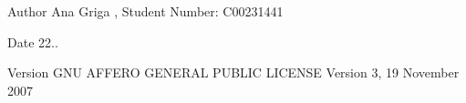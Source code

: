 \begin{DoxyAuthor}{Author}
Ana Griga , Student Number\+: C00231441 
\end{DoxyAuthor}
\begin{DoxyDate}{Date}
22.. 
\end{DoxyDate}
\begin{DoxyVersion}{Version}
G\+NU A\+F\+F\+E\+RO G\+E\+N\+E\+R\+AL P\+U\+B\+L\+IC L\+I\+C\+E\+N\+SE Version 3, 19 November 2007 
\end{DoxyVersion}
